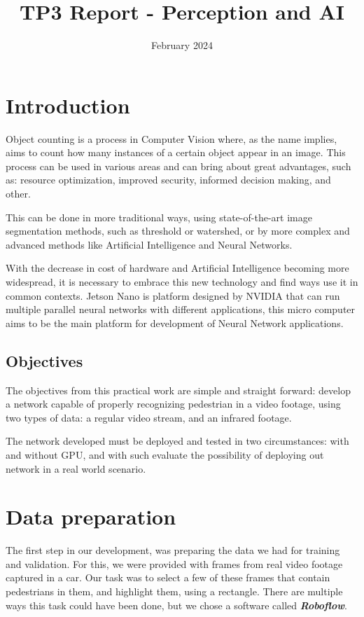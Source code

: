 \documentclass[conference]{IEEEtran}
\title{TP3 Report - Perception and AI}
\author{\IEEEauthorblockN{Bruno Luiz Dias Alves de Castro}
\IEEEauthorblockA{\textit{ESIEE Paris}}
\and
\IEEEauthorblockN{Victor Gabriel Mendes Sündermann}
\IEEEauthorblockA{\textit{ESIEE Paris}}
}
\date{February 2024}
\begin{document}
\maketitle

\section{Introduction}

Object counting is a process in Computer Vision where, as the name implies, aims to count how many instances of a certain object appear in an image. This process can be used in various areas and can bring about great advantages, such as: resource optimization, improved security, informed decision making, and other.

This can be done in more traditional ways, using state-of-the-art image segmentation methods, such as threshold or watershed, or by more complex and advanced methods like Artificial Intelligence and Neural Networks.

With the decrease in cost of hardware and Artificial Intelligence becoming more widespread, it is necessary to embrace this new technology and find ways use it in common contexts. Jetson Nano is platform designed by NVIDIA that can run multiple parallel neural networks with different applications, this micro computer aims to be the main platform for development of Neural Network applications.
\subsection{Objectives}

The objectives from this practical work are simple and straight forward: develop a network capable of properly recognizing pedestrian in a video footage, using two types of data: a regular video stream, and an infrared footage.

The network developed must be deployed and tested in two circumstances: with and without GPU, and with such evaluate the possibility of deploying out network in a real world scenario.

\section{Data preparation}

The first step in our development, was preparing the data we had for training and validation. For this, we were provided with frames from real video footage captured in a car. Our task was to select a few of these frames that contain pedestrians in them, and highlight them, using a rectangle. There are multiple ways this task could have been done, but we chose a software called \textit{\textbf{Roboflow}}.
\end{document}
